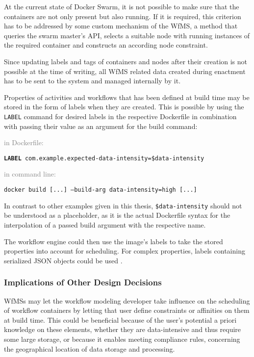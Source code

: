     At the current state of Docker Swarm, it is not possible to make sure that the containers are not only present but also running. If it is required, this criterion has to be addressed by some custom mechanism of the \ac{WfMS}, \eg a method that queries the swarm master's \ac{API}, selects a suitable node with running instances of the required container and constructs an according node constraint.

    Since updating labels and tags of containers and nodes after their creation is not possible at the time of writing, all \ac{WfMS} related data created during enactment has to be sent to the system and managed internally by it.

    Properties of activities and workflows that has been defined at build time may be stored in the form of labels when they are created. This is possible by using the \texttt{LABEL} command for desired labels in the respective Dockerfile in combination with passing their value as an argument for the build command:

    \textcolor{gray}{in Dockerfile:}

    \centerline{\texttt{\textbf{LABEL} com.example.expected-data-intensity=\$data-intensity}}

    \textcolor{gray}{in command line:}

    \centerline{\texttt{docker build [...] --build-arg data-intensity=high [...]}}

    In contrast to other examples given in this thesis, \texttt{\$data-intensity} should not be understood as a placeholder, as it is the actual Dockerfile syntax for the interpolation of a passed build argument with the respective name.

    The workflow engine could then use the image's labels to take the stored properties into account for scheduling. For complex properties, labels containing serialized JSON objects could be used \cite{Docker????Docker}.

  \subsubsection{Implications of Other Design Decisions} %
  \label{ssub:implications_of_other_design_decisions}
    \acp{WfMS} may let the workflow modeling developer take influence on the scheduling of workflow containers by letting that user define constraints or affinities on them at build time. This could be beneficial because of the user's potential a priori knowledge on these elements, \eg whether they are data-intensive and thus require some large storage, or because it enables meeting compliance rules, \eg concerning the geographical location of data storage and processing.

